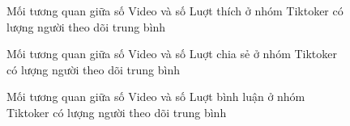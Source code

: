 \begin{figure}[H]
    \centering
    \caption{Mối tương quan giữa số Video và số Luợt thích ở nhóm Tiktoker có lượng người theo dõi trung bình}
    \label{fig:so_video_luot_thich_nhom_TB}
\end{figure} 

\begin{figure}[H]
    \centering
    \caption{Mối tương quan giữa số Video và số Luợt chia sẻ ở nhóm Tiktoker có lượng người theo dõi trung bình}
    \label{fig:so_video_luot_chia_se_nhom_TB}
\end{figure}

\begin{figure}[H]
    \centering
    \caption{Mối tương quan giữa số Video và số Luợt bình luận ở nhóm Tiktoker có lượng người theo dõi trung bình}
    \label{fig:so_video_binh_luan_nhom_TB}
\end{figure}


